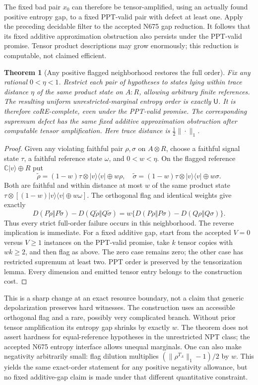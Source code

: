 \documentclass[11pt]{article}
\newtheorem{theorem}{Theorem}
\newcommand{\C}{\mathbb C}
\begin{document}
The fixed bad pair $x_0$ can therefore be tensor-amplified, using an actually
found positive entropy gap, to a fixed PPT-valid pair with defect at least one.
Apply the preceding decidable filter to the accepted N675 gap reduction.
It follows that its fixed additive approximation obstruction also persists
under the PPT-valid promise. Tensor product descriptions may grow enormously;
this reduction is computable, not claimed efficient.

\begin{theorem}[Any positive flagged neighborhood restores the full order]
Fix any rational $0<\eta<1$. Restrict each pair of hypotheses to states lying
within trace distance $\eta$ of the same product state on $A:R$, allowing
arbitrary finite references. The resulting uniform unrestricted-marginal
entropy order is exactly $\mathsf U$. It is therefore coRE-complete, even
under the PPT-valid promise. The corresponding supremum defect has the
same fixed additive approximation obstruction after computable tensor
amplification. Here trace distance is $\tfrac12\|\cdot\|_1$.
\end{theorem}
\begin{proof}
Given any violating faithful pair $\rho,\sigma$ on $A\otimes R$, choose a
faithful signal state $\tau$, a faithful reference state $\omega$, and
$0<w<\eta$. On the flagged reference $\C|v\rangle\oplus R$ put
\[
 \widetilde\rho=(1-w)\tau\otimes|v\rangle\langle v|\oplus w\rho,
 \quad
 \widetilde\sigma=(1-w)\tau\otimes|v\rangle\langle v|\oplus w\sigma.
                                                               \tag{22}
\]
Both are faithful and within distance at most $w$ of the same product state
$\tau\otimes[(1-w)|v\rangle\langle v|\oplus w\omega]$.
The orthogonal flag and identical weights give exactly
\[
 D(P\widetilde\rho\Vert P\widetilde\sigma)
 -D(Q\widetilde\rho\Vert Q\widetilde\sigma)
 =w\{D(P\rho\Vert P\sigma)-D(Q\rho\Vert Q\sigma)\}.          \tag{23}
\]
Thus every strict full-order failure occurs in this neighborhood. The reverse
implication is immediate. For a fixed additive gap, start from the accepted
$V=0$ versus $V\geq1$ instances on the PPT-valid promise, take $k$ tensor
copies with $wk\geq2$, and then flag as above. The zero case remains zero;
the other case has restricted supremum at least two. PPT order is preserved
by the tensorization lemma. Every dimension and emitted tensor entry belongs
to the construction cost.
\end{proof}

This is a sharp change at an exact resource boundary, not a claim that generic
depolarization preserves hard witnesses. The construction uses an accessible
orthogonal flag and a rare, possibly very complicated branch. Without prior
tensor amplification its entropy gap shrinks by exactly $w$. The theorem
does not assert hardness for equal-reference hypotheses in the unrestricted
NPT class; the accepted N675 entropy interface allows unequal marginals.
One can also make negativity arbitrarily small: flag dilution multiplies
$(\|\rho^{T_A}\|_1-1)/2$ by $w$. This yields the same exact-order statement
for any positive negativity allowance, but no fixed additive-gap claim is
made under that different quantitative constraint.
\end{document}
